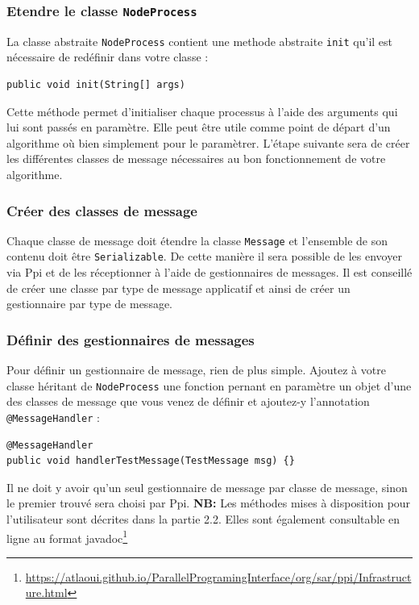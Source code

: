 \documentclass{article}
\begin{document}
		\subsubsection{Etendre le classe \lstinline{NodeProcess}}
		La classe abstraite \lstinline{NodeProcess} contient une methode abstraite \lstinline{init}
		qu'il est nécessaire de redéfinir dans votre classe :
		\begin{lstlisting}
public void init(String[] args)
		\end{lstlisting}
		Cette méthode permet d'initialiser chaque processus à l'aide des arguments qui lui sont
		passés en paramètre. Elle peut être utile comme point de départ d'un algorithme où bien
		simplement pour le paramètrer.
		L'étape suivante sera de créer les différentes classes de message nécessaires au bon
		fonctionnement de votre algorithme.

		\subsubsection{Créer des classes de message}
		Chaque classe de message doit étendre la classe \lstinline{Message} et l'ensemble de son
		contenu doit être \lstinline{Serializable}. De cette manière il sera possible de les envoyer
		via Ppi et de les réceptionner à l'aide de gestionnaires de messages. Il est conseillé de
		créer une classe par type de message applicatif et ainsi de créer un gestionnaire par type
		de message.

		\subsubsection{Définir des gestionnaires de messages}
		Pour définir un gestionnaire de message, rien de plus simple. Ajoutez à votre classe
		héritant de \lstinline{NodeProcess} une fonction pernant en paramètre un objet d'une des
		classes de message que vous venez de définir et ajoutez-y l'annotation
		\lstinline{@MessageHandler} :
		\begin{lstlisting}
@MessageHandler
public void handlerTestMessage(TestMessage msg) {}
		\end{lstlisting}

		Il ne doit y avoir qu'un seul gestionnaire de message par classe de message, sinon le
		premier trouvé sera choisi par Ppi.
		\newline
		\newline
		\newline
		\textbf{NB:} Les méthodes mises à disposition pour l'utilisateur sont décrites dans la partie 2.2.
		Elles sont également consultable en ligne au format javadoc\footnote{\href{https://atlaoui.github.io/ParallelProgramingInterface/org/sar/ppi/Infrastructure.html}{https://atlaoui.github.io/ParallelProgramingInterface/org/sar/ppi/Infrastructure.html}}
\end{document}
